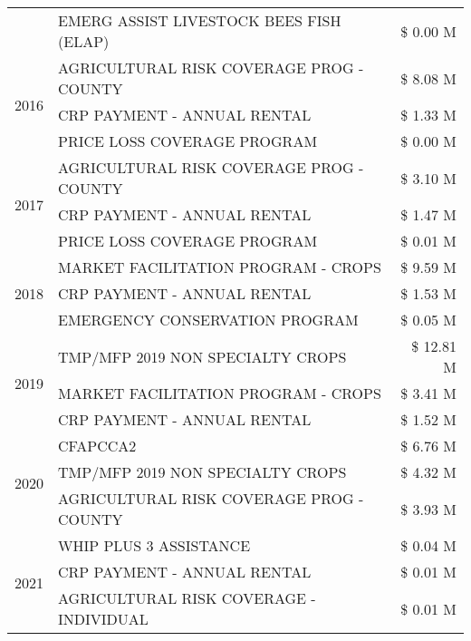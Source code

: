 \begin{tabular}{llr}
 & EMERG ASSIST LIVESTOCK BEES FISH (ELAP) & \$ 0.00 M \\
\cline{1-3}
\multirow[t]{3}{*}{2016} & AGRICULTURAL RISK COVERAGE PROG - COUNTY      & \$ 8.08 M \\
 & CRP PAYMENT - ANNUAL RENTAL                   & \$ 1.33 M \\
 & PRICE LOSS COVERAGE PROGRAM                   & \$ 0.00 M \\
\cline{1-3}
\multirow[t]{3}{*}{2017} & AGRICULTURAL RISK COVERAGE PROG - COUNTY & \$ 3.10 M \\
 & CRP PAYMENT - ANNUAL RENTAL & \$ 1.47 M \\
 & PRICE LOSS COVERAGE PROGRAM & \$ 0.01 M \\
\cline{1-3}
\multirow[t]{3}{*}{2018} & MARKET FACILITATION PROGRAM - CROPS & \$ 9.59 M \\
 & CRP PAYMENT - ANNUAL RENTAL & \$ 1.53 M \\
 & EMERGENCY CONSERVATION PROGRAM & \$ 0.05 M \\
\cline{1-3}
\multirow[t]{3}{*}{2019} & TMP/MFP 2019 NON SPECIALTY CROPS & \$ 12.81 M \\
 & MARKET FACILITATION PROGRAM - CROPS & \$ 3.41 M \\
 & CRP PAYMENT - ANNUAL RENTAL & \$ 1.52 M \\
\cline{1-3}
\multirow[t]{3}{*}{2020} & CFAPCCA2 & \$ 6.76 M \\
 & TMP/MFP 2019 NON SPECIALTY CROPS & \$ 4.32 M \\
 & AGRICULTURAL RISK COVERAGE PROG - COUNTY & \$ 3.93 M \\
\cline{1-3}
\multirow[t]{3}{*}{2021} & WHIP PLUS 3 ASSISTANCE & \$ 0.04 M \\
 & CRP PAYMENT - ANNUAL RENTAL & \$ 0.01 M \\
 & AGRICULTURAL RISK COVERAGE - INDIVIDUAL & \$ 0.01 M \\
\cline{1-3}
\bottomrule
\end{tabular}
